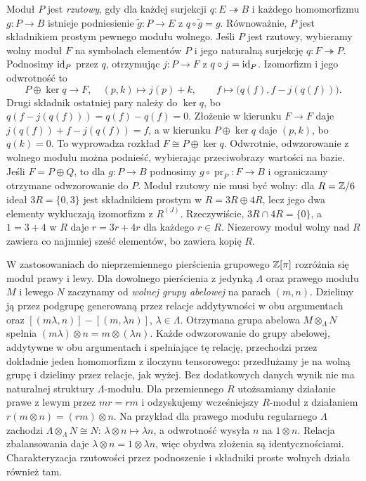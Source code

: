 \begin{uwaga}
\label{uwaga:moduly-projektywne}
Moduł $P$ jest \emph{rzutowy}, gdy dla każdej
surjekcji $q:E\twoheadrightarrow B$ i każdego
homomorfizmu $g:P\to B$ istnieje podniesienie
$\widetilde g:P\to E$ z $q\circ\widetilde g=g$.
Równoważnie, $P$ jest składnikiem prostym
pewnego modułu wolnego. Jeśli $P$ jest rzutowy,
wybieramy wolny moduł $F$ na symbolach elementów
$P$ i jego naturalną surjekcję $q:F\twoheadrightarrow P$.
Podnosimy $\mathrm{id}_P$ przez $q$, otrzymując $j:P\to F$
z $q\circ j=\mathrm{id}_P$. Izomorfizm i jego odwrotność to
\[
 P\oplus\ker q\longrightarrow F,\quad (p,k)\longmapsto j(p)+k,
 \qquad
 f\longmapsto\bigl(q(f),f-j(q(f))\bigr).
\]
Drugi składnik ostatniej pary należy do $\ker q$, bo
$q(f-j(q(f)))=q(f)-q(f)=0$.
Złożenie w kierunku $F\to F$ daje $j(q(f))+f-j(q(f))=f$,
a w kierunku $P\oplus\ker q$ daje $(p,k)$, bo $q(k)=0$.
To wyprowadza rozkład $F\cong P\oplus\ker q$. Odwrotnie,
odwzorowanie z wolnego modułu można podnieść,
wybierając przeciwobrazy wartości na bazie.
Jeśli $F=P\oplus Q$, to dla $g:P\to B$
podnosimy $g\circ\operatorname{pr}_P:F\to B$
i ograniczamy otrzymane odwzorowanie do $P$.
Moduł rzutowy nie musi być wolny: dla
$R=\mathbb{Z}/6$ ideał $3R=\{0,3\}$ jest składnikiem
prostym w $R=3R\oplus4R$, lecz jego dwa
elementy wykluczają izomorfizm z $R^{(J)}$.
Rzeczywiście, $3R\cap4R=\{0\}$, a $1=3+4$ w $R$ daje
$r=3r+4r$ dla każdego $r\in R$. Niezerowy moduł wolny
nad $R$ zawiera co najmniej sześć elementów, bo zawiera kopię $R$.
\end{uwaga}

W zastosowaniach do nieprzemiennego pierścienia
grupowego $\mathbb{Z}[\pi]$ rozróżnia się moduł prawy
i lewy. Dla dowolnego pierścienia z jedynką $\Lambda$
oraz prawego modułu $M$ i lewego $N$ zaczynamy od
\emph{wolnej grupy abelowej} na parach $(m,n)$.
Dzielimy ją przez podgrupę generowaną przez relacje
addytywności w obu argumentach oraz
$[(m\lambda,n)]-[(m,\lambda n)]$, $\lambda\in\Lambda$.
Otrzymana grupa abelowa $M\otimes_\Lambda N$ spełnia
$(m\lambda)\otimes n=m\otimes(\lambda n)$.
Każde odwzorowanie do grupy abelowej, addytywne w obu
argumentach i spełniające tę relację, przechodzi przez
dokładnie jeden homomorfizm z iloczynu tensorowego: przedłużamy je
na wolną grupę i dzielimy przez relacje, jak wyżej.
Bez dodatkowych danych wynik nie ma naturalnej struktury
$\Lambda$-modułu. Dla przemiennego $R$ utożsamiamy działanie
prawe z lewym przez $mr=rm$ i odzyskujemy wcześniejszy
$R$-moduł z działaniem $r(m\otimes n)=(rm)\otimes n$.
Na przykład dla prawego modułu regularnego $\Lambda$ zachodzi
$\Lambda\otimes_\Lambda N\cong N$:
$\lambda\otimes n\mapsto\lambda n$, a odwrotność
wysyła $n$ na $1\otimes n$. Relacja zbalansowania daje
$\lambda\otimes n=1\otimes\lambda n$, więc obydwa
złożenia są identycznościami.
Charakteryzacja rzutowości przez podnoszenie i
składniki proste wolnych działa również tam.

